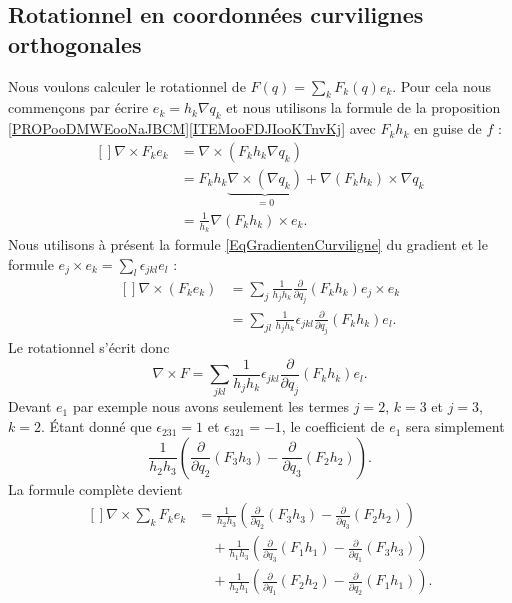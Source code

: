 \subsection{Rotationnel en coordonnées curvilignes orthogonales}

Nous voulons calculer le rotationnel de $F(q)=\sum_kF_k(q)e_k$. Pour cela nous commençons par écrire $e_k=h_k\nabla q_k$ et nous utilisons la formule de la proposition \ref{PROPooDMWEooNaJBCM}\ref{ITEMooFDJIooKTnvKj} avec $F_kh_k$ en guise de $f$ :
\begin{equation}
	\begin{aligned}[]
		\nabla\times F_ke_k & =\nabla\times(F_kh_k\nabla q_k)                                                  \\
		                    & =F_kh_k\underbrace{\nabla\times(\nabla q_k)}_{=0}+\nabla(F_kh_k)\times\nabla q_k \\
		                    & =\frac{1}{ h_k }\nabla(F_kh_k)\times e_k.
	\end{aligned}
\end{equation}
Nous utilisons à présent la formule \eqref{EqGradientenCurviligne} du gradient et le formule $e_j\times e_k=\sum_l\epsilon_{jkl}e_l$ :
\begin{equation}
	\begin{aligned}[]
		\nabla\times(F_ke_k) & =\sum_{j}\frac{1}{ h_jh_k }\frac{ \partial  }{ \partial q_j }(F_kh_k)e_j\times e_k       \\
		                     & =\sum_{jl}\frac{1}{ h_jh_k }\epsilon_{jkl}\frac{ \partial  }{ \partial q_j }(F_kh_k)e_l.
	\end{aligned}
\end{equation}
Le rotationnel s'écrit donc
\begin{equation}
	\nabla\times F=\sum_{jkl}\frac{1}{ h_jh_k }\epsilon_{jkl}\frac{ \partial  }{ \partial q_j }(F_kh_k)e_l.
\end{equation}
Devant $e_1$ par exemple nous avons seulement les termes $j=2$, $k=3$ et $j=3$, $k=2$. Étant donné que $\epsilon_{231}=1$ et $\epsilon_{321}=-1$, le coefficient de $e_1$ sera simplement
\begin{equation}
	\frac{1}{ h_2h_3 }\left( \frac{ \partial  }{ \partial q_2 }(F_3h_3)-\frac{ \partial  }{ \partial q_3 }(F_2h_2) \right).
\end{equation}
La formule complète devient
\begin{equation}
	\begin{aligned}[]
		\nabla\times\sum_k F_ke_k & =\frac{1}{ h_2h_3 }\left( \frac{ \partial  }{ \partial q_2 }(F_3h_3)-\frac{ \partial  }{ \partial q_3 }(F_2h_2) \right)       \\
		                          & \quad+\frac{1}{ h_1h_3 }\left( \frac{ \partial  }{ \partial q_3 }(F_1h_1)-\frac{ \partial  }{ \partial q_1 }(F_3h_3) \right)  \\
		                          & \quad+\frac{1}{ h_2h_1 }\left( \frac{ \partial  }{ \partial q_1 }(F_2h_2)-\frac{ \partial  }{ \partial q_2 }(F_1h_1) \right).
	\end{aligned}
\end{equation}

